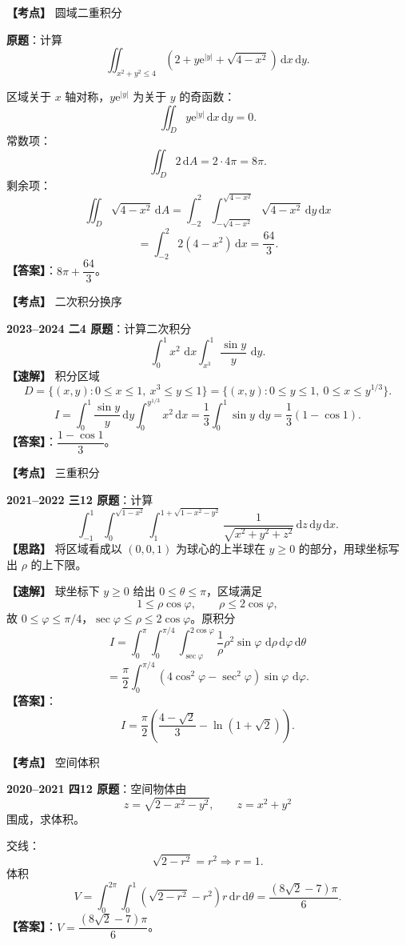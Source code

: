﻿\documentclass[11pt,a4paper,UTF8]{ctexart}
\newcommand{\dd}{\,\mathrm d}
\newcommand{\ee}{\mathrm e}
\begin{document}
\begin{answerbox}[2020--2021 二-7]
\textbf{【考点】} 圆域二重积分

\textbf{原题}：计算
\[
\iint_{x^2+y^2\le4}\left(2+y\ee^{|y|}+\sqrt{4-x^2}\right)\dd x\dd y.
\]

区域关于 $x$ 轴对称，$y\ee^{|y|}$ 为关于 $y$ 的奇函数：
\[
\iint_D y\ee^{|y|}\dd x\dd y=0.
\]
常数项：
\[
\iint_D2\dd A=2\cdot4\pi=8\pi.
\]
剩余项：
\[
\iint_D\sqrt{4-x^2}\dd A
=\int_{-2}^2\int_{-\sqrt{4-x^2}}^{\sqrt{4-x^2}}\sqrt{4-x^2}\dd y\dd x
\]
\[
=\int_{-2}^2 2(4-x^2)\dd x=\frac{64}{3}.
\]
\textbf{【答案】}：$8\pi+\dfrac{64}{3}$。
\end{answerbox}

\begin{answerbox}[2023--2024 二-4]
\textbf{【考点】} 二次积分换序

\textbf{2023--2024 二4 原题}：计算二次积分
\[
\int_0^1 x^2\,\dd x\int_{x^3}^{1}\frac{\sin y}{y}\,\dd y.
\]
\textbf{【速解】} 积分区域
\[
D=\{(x,y):0\le x\le1,\ x^3\le y\le1\}
=\{(x,y):0\le y\le1,\ 0\le x\le y^{1/3}\}.
\]
\[
I=\int_0^1\frac{\sin y}{y}\dd y\int_0^{y^{1/3}}x^2\dd x
=\frac13\int_0^1\sin y\,\dd y
=\frac13(1-\cos1).
\]
\textbf{【答案】}：$\dfrac{1-\cos1}{3}$。

\end{answerbox}

\begin{answerbox}[2021--2022 三-12]
\textbf{【考点】} 三重积分

\textbf{2021--2022 三12 原题}：计算
\[
\int_{-1}^{1}\int_0^{\sqrt{1-x^2}}\int_1^{1+\sqrt{1-x^2-y^2}}
\frac1{\sqrt{x^2+y^2+z^2}}\dd z\dd y\dd x.
\]
\textbf{【思路】} 将区域看成以 $(0,0,1)$ 为球心的上半球在 $y\ge0$ 的部分，用球坐标写出 $\rho$ 的上下限。

\textbf{【速解】} 球坐标下 $y\ge0$ 给出 $0\le\theta\le\pi$，区域满足
\[
1\le \rho\cos\varphi,\qquad \rho\le2\cos\varphi,
\]
故 $0\le\varphi\le\pi/4$，$\sec\varphi\le\rho\le2\cos\varphi$。原积分
\[
I=\int_0^\pi\int_0^{\pi/4}\int_{\sec\varphi}^{2\cos\varphi}
\frac1\rho \rho^2\sin\varphi\,\dd\rho\dd\varphi\dd\theta
\]
\[
=\frac\pi2\int_0^{\pi/4}\left(4\cos^2\varphi-\sec^2\varphi\right)\sin\varphi\,\dd\varphi.
\]
\textbf{【答案】}：
\[
I=\frac\pi2\left(\frac{4-\sqrt2}{3}-\ln(1+\sqrt2)\right).
\]

\end{answerbox}

\begin{answerbox}[2020--2021 四-12]
\textbf{【考点】} 空间体积

\textbf{2020--2021 四12 原题}：空间物体由
\[
z=\sqrt{2-x^2-y^2},
\qquad z=x^2+y^2
\]
围成，求体积。

交线：
\[
\sqrt{2-r^2}=r^2\Rightarrow r=1.
\]
体积
\[
V=\int_0^{2\pi}\int_0^1\left(\sqrt{2-r^2}-r^2\right)r\dd r\dd\theta
=\frac{(8\sqrt2-7)\pi}{6}.
\]
\textbf{【答案】}：$V=\dfrac{(8\sqrt2-7)\pi}{6}$。

\end{answerbox}
\end{document}
